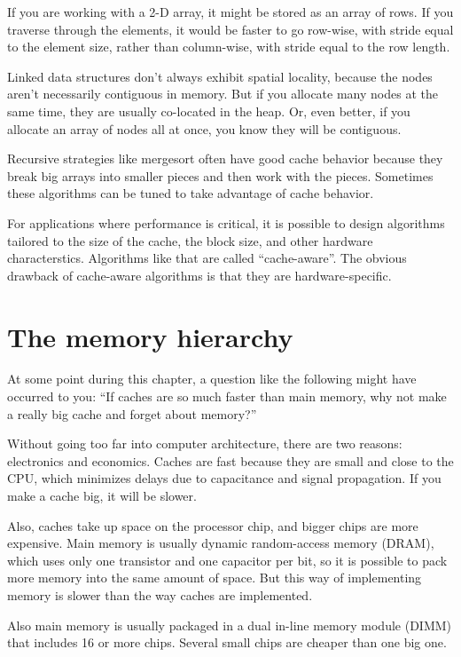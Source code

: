 \documentclass[12pt]{book}
\begin{document}
{If you are working with a 2-D array, it might be stored as an array
of rows.  If you traverse through the elements, it would be faster
to go row-wise, with stride equal to the element size, rather
than column-wise, with stride equal to the row length.

Linked data structures don't always exhibit spatial locality, because
the nodes aren't necessarily contiguous in memory.  But if you allocate
many nodes at the same time, they are usually co-located in the heap.
Or, even better, if you allocate an array of nodes all at once, you
know they will be contiguous.

Recursive strategies like mergesort often have good cache behavior
because they break big arrays into smaller pieces and then work
with the pieces.  Sometimes these algorithms can be tuned to take
advantage of cache behavior.

For applications where performance is critical, it is possible
to design algorithms tailored to the size of the cache, the block size,
and other hardware characterstics.  Algorithms like that are
called ``cache-aware''.  The obvious drawback of cache-aware
algorithms is that they are hardware-specific.


\section{The memory hierarchy}

At some point during this chapter, a question like the following
might have occurred to you: ``If caches are so much faster than
main memory, why not make a really big cache and forget about
memory?''

Without going too far into computer architecture, there are two
reasons: electronics and economics.  Caches are fast because they are
small and close to the CPU, which minimizes delays due to capacitance
and signal propagation.  If you make a cache big, it will be slower.

Also, caches take up space on the processor chip, and bigger chips are
more expensive.  Main memory is usually dynamic random-access memory
(DRAM), which uses only one transistor and one capacitor per bit, so
it is possible to pack more memory into the same amount of space.  But
this way of implementing memory is slower than the way caches are
implemented.
 
Also main memory is usually packaged in a dual in-line memory module
(DIMM) that includes 16 or more chips.  Several small chips are cheaper
than one big one.

}
\end{document}
